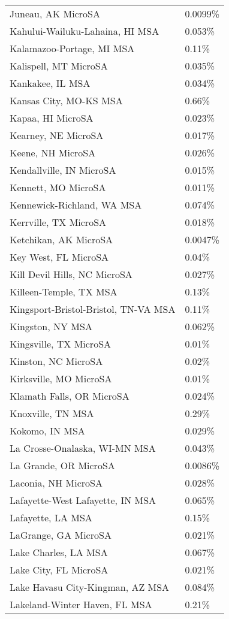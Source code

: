 \begin{longtable}[]{@{}ll@{}}
Juneau, AK MicroSA & 0.0099\% \\
Kahului-Wailuku-Lahaina, HI MSA & 0.053\% \\
Kalamazoo-Portage, MI MSA & 0.11\% \\
Kalispell, MT MicroSA & 0.035\% \\
Kankakee, IL MSA & 0.034\% \\
Kansas City, MO-KS MSA & 0.66\% \\
Kapaa, HI MicroSA & 0.023\% \\
Kearney, NE MicroSA & 0.017\% \\
Keene, NH MicroSA & 0.026\% \\
Kendallville, IN MicroSA & 0.015\% \\
Kennett, MO MicroSA & 0.011\% \\
Kennewick-Richland, WA MSA & 0.074\% \\
Kerrville, TX MicroSA & 0.018\% \\
Ketchikan, AK MicroSA & 0.0047\% \\
Key West, FL MicroSA & 0.04\% \\
Kill Devil Hills, NC MicroSA & 0.027\% \\
Killeen-Temple, TX MSA & 0.13\% \\
Kingsport-Bristol-Bristol, TN-VA MSA & 0.11\% \\
Kingston, NY MSA & 0.062\% \\
Kingsville, TX MicroSA & 0.01\% \\
Kinston, NC MicroSA & 0.02\% \\
Kirksville, MO MicroSA & 0.01\% \\
Klamath Falls, OR MicroSA & 0.024\% \\
Knoxville, TN MSA & 0.29\% \\
Kokomo, IN MSA & 0.029\% \\
La Crosse-Onalaska, WI-MN MSA & 0.043\% \\
La Grande, OR MicroSA & 0.0086\% \\
Laconia, NH MicroSA & 0.028\% \\
Lafayette-West Lafayette, IN MSA & 0.065\% \\
Lafayette, LA MSA & 0.15\% \\
LaGrange, GA MicroSA & 0.021\% \\
Lake Charles, LA MSA & 0.067\% \\
Lake City, FL MicroSA & 0.021\% \\
Lake Havasu City-Kingman, AZ MSA & 0.084\% \\
Lakeland-Winter Haven, FL MSA & 0.21\% \\

\end{longtable}
